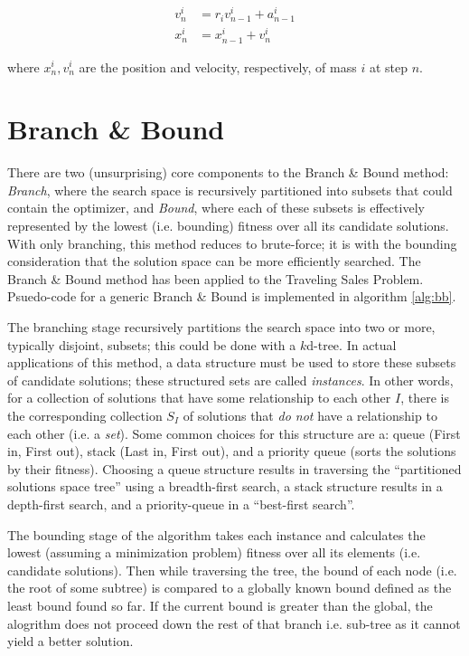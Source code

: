 \documentclass{article}
\begin{document}
            \begin{align}
                v_n^i &= r_i v_{n-1}^i + a_{n - 1}^i \\
                x_n^i &= x_{n - 1}^i + v_n^i
            \end{align}

            where $x_n^i, v_n^i$ are the position and velocity, respectively, of mass $i$ at step $n$.
\clearpage
\pagebreak

        \section*{Branch \& Bound}

            There are two (unsurprising) core components to the Branch \& Bound method: \emph{Branch}, where the search space is recursively partitioned into subsets that could contain the optimizer, and \emph{Bound}, where each of these subsets is effectively represented by the lowest (i.e. bounding) fitness over all its candidate solutions.  With only branching, this method reduces to brute-force;  it is with the bounding consideration that the solution space can be more efficiently searched.  The Branch \& Bound method has been applied to the Traveling Sales Problem\cite{branch_bound}.  Psuedo-code for a generic Branch \& Bound is implemented in algorithm \ref{alg:bb}.

            The branching stage recursively partitions the search space into two or more, typically disjoint, subsets; this could be done with a $k$d-tree.  In actual applications of this method, a data structure must be used to store these subsets of candidate solutions; these structured sets are called \emph{instances}.  In other words, for a collection of solutions that have some relationship to each other $I$, there is the corresponding collection $S_I$ of solutions that \emph{do not} have a relationship to each other (i.e. a \emph{set}).  Some common choices for this structure are a: queue (First in, First out), stack (Last in, First out), and a priority queue (sorts the solutions by their fitness)\cite{Clausen2003BranchAB}.  Choosing a queue structure results in traversing the ``partitioned solutions space tree'' using a breadth-first search, a stack structure results in a depth-first search, and a priority-queue in a ``best-first search''\cite{toolbox}.

            The bounding stage of the algorithm takes each instance and calculates the lowest (assuming a minimization problem) fitness over all its elements (i.e. candidate solutions).  Then while traversing the tree, the bound of each node (i.e. the root of some subtree) is compared to a globally known bound defined as the least bound found so far.  If the current bound is greater than the global, the alogrithm does not proceed down the rest of that branch i.e. sub-tree as it cannot yield a better solution.
\end{document}
